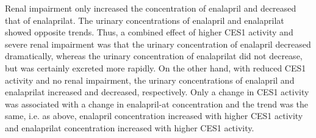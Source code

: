 Renal impairment only increased the concentration of enalapril and decreased that of enalaprilat. The urinary concentrations of ena\-lapril and enalaprilat showed opposite trends. Thus, a combined effect of higher CES1 activity and severe renal impairment was that the urinary concentration of enalapril decreased dramatically, whereas the urinary concentration of enalaprilat did not decrease, but was certainly excreted more rapidly. On the other hand, with reduced CES1 activity and no renal impairment, the urinary concentrations of enalapril and enalaprilat increased and decreased, respectively. Only a change in CES1 activity was associated with a change in enalapril-at concentration and the trend was the same, i.e. as above, enalapril concentration increased with higher CES1 activity and enalaprilat concentration increased with higher CES1 activity.



